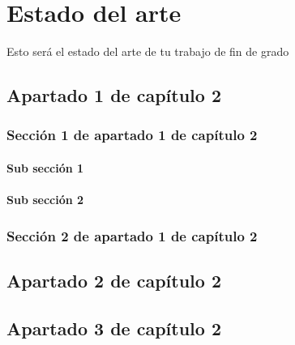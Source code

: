 \chapter{Estado del arte}

Esto será el estado del arte de tu trabajo de fin de grado

\section{Apartado 1 de capítulo 2}

\subsection{Sección 1 de apartado 1 de capítulo 2}

\subsubsection{Sub sección 1}

\subsubsection{Sub sección 2}

\subsection{Sección 2 de apartado 1 de capítulo 2}

\section{Apartado 2 de capítulo 2}

\section{Apartado 3 de capítulo 2}